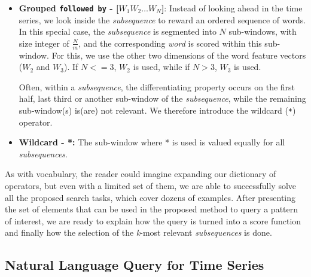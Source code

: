 {\begin{itemize}
\item	\textbf{Grouped \texttt{followed by} - [$W_1 W_2 … W_N$]}: Instead of looking ahead in the time series, we look inside the \textit{subsequence} to reward an ordered sequence of words. In this special case, the \textit{subsequence} is segmented into $N$ sub-windows, with size integer of $\frac{N}{m}$, and the corresponding \textit{word} is scored within this sub-window. For this, we use the other two dimensions of the word feature vectors ($W_2$ and $W_3$). If $N<=3$, $W_2$ is used, while if $N>3$, $W_3$ is used.

Often, within a \textit{subsequence}, the differentiating property occurs on the first half, last third or another sub-window of the \textit{subsequence}, while the remaining sub-window(s) is(are) not relevant. We therefore introduce the wildcard (\texttt{*}) operator.

\item \textbf{Wildcard - *:} The sub-window where * is used is valued equally for all \textit{subsequences}.
\end{itemize}

As with vocabulary, the reader could imagine expanding our dictionary of operators, but even with a limited set of them, we are able to successfully solve all the proposed search tasks, which cover dozens of examples. After presenting the set of elements that can be used in the proposed method to query a pattern of interest, we are ready to explain how the query is turned into a score function and finally how the selection of the \textit{k}-most relevant \textit{subsequences} is done. 

\subsection{Natural Language Query for Time Series}

}
